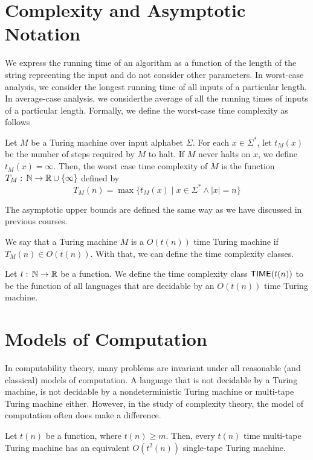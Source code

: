 \section{Complexity and Asymptotic Notation}

We express the running time of an algorithm as a function of the length of the string repreenting the input and do not consider other parameters. In worst-case analysis, we consider the longest running time of all inputs of a particular length. In average-case analysis, we considerthe average of all the running times of inputs of a particular length. Formally, we define the worst-case time complexity as follows

\begin{definition}
    Let $M$ be a Turing machine over input alphabet $\Sigma$. For each $x \in \Sigma^*$, let $t_M(x)$ be the number of steps required by $M$ to halt. If $M$ never halts on $x$, we define $t_M(x) = \infty$. Then, the worst case time complexity of $M$ is the function $T_M:\, \mathbb{N} \to \mathbb{R} \cup \{\infty\}$ defined by
    $$
    T_M(n) = \max \{t_M(x) \mid x \in \Sigma^* \land |x| = n \}
    $$
\end{definition}

The asymptotic upper bounds are defined the same way as we have discussed in previous courses.

We say that a Turing machine $M$ is a $O(t(n))$ time Turing machine if $T_M(n) \in O(t(n))$. With that, we can define the time complexity classes.

\begin{definition}[TIME]
    Let $t:\, \mathbb{N} \to \mathbb{R}$ be a function. We define the time complexity class $\mathsf{TIME}(t(n))$ to be the function of all languages that are decidable by an $O(t(n))$ time Turing machine.
\end{definition}

\section{Models of Computation}

In computability theory, many problems are invariant under all reasonable (and classical) models of computation. A language that is not decidable by a Turing machine, is not decidable by a nondeterministic Turing machine or multi-tape Turing machine either. However, in the study of complexity theory, the model of computation often does make a difference.

\begin{theorem}
    Let $t(n)$ be a function, where $t(n) \geq m$. Then, every $t(n)$ time multi-tape Turing machine has an equivalent $O(t^2(n))$ single-tape Turing machine.
\end{theorem}

